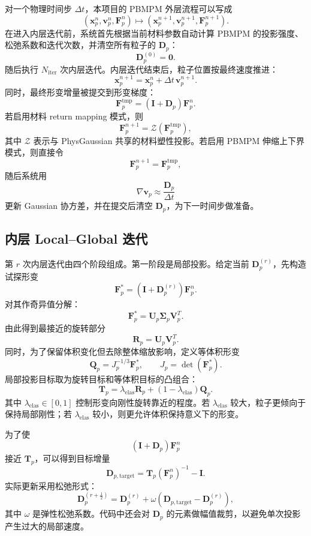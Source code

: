 \documentclass[a4paper]{article}
\begin{document}
对一个物理时间步 $\Delta t$，本项目的 PBMPM 外层流程可以写成
\[
    \left(
        \bm{x}_p^n,
        \bm{v}_p^n,
        \bm{F}_p^n
    \right)
    \longmapsto
    \left(
        \bm{x}_p^{n+1},
        \bm{v}_p^{n+1},
        \bm{F}_p^{n+1}
    \right).
\]
在进入内层迭代前，系统首先根据当前材料参数自动计算 PBMPM 的投影强度、松弛系数和迭代次数，并清空所有粒子的 $\bm{D}_p$：
\[
    \bm{D}_p^{(0)}=\bm{0}.
\]
随后执行 $N_{\mathrm{iter}}$ 次内层迭代。内层迭代结束后，粒子位置按最终速度推进：
\[
    \bm{x}_p^{n+1}
    =
    \bm{x}_p^n
    +
    \Delta t\,\bm{v}_p^{n+1}.
\]
同时，最终形变增量被提交到形变梯度：
\[
    \bm{F}_p^{\mathrm{tmp}}
    =
    \left(
        \bm{I}
        +
        \bm{D}_p
    \right)
    \bm{F}_p^n.
\]
若启用材料 return mapping 模式，则
\[
    \bm{F}_p^{n+1}
    =
    \mathcal{Z}
    \left(
        \bm{F}_p^{\mathrm{tmp}}
    \right),
\]
其中 $\mathcal{Z}$ 表示与 PhysGaussian 共享的材料塑性投影。若启用 PBMPM 伸缩上下界模式，则直接令
\[
    \bm{F}_p^{n+1}
    =
    \bm{F}_p^{\mathrm{tmp}},
\]
随后系统用
\[
    \nabla\bm{v}_p
    \approx
    \frac{\bm{D}_p}{\Delta t}
\]
更新 Gaussian 协方差，并在提交后清空 $\bm{D}_p$，为下一时间步做准备。

\subsection{内层 Local--Global 迭代}

第 $r$ 次内层迭代由四个阶段组成。第一阶段是局部投影。给定当前 $\bm{D}_p^{(r)}$，先构造试探形变
\[
    \bm{F}_p^\ast
    =
    \left(
        \bm{I}
        +
        \bm{D}_p^{(r)}
    \right)
    \bm{F}_p^n.
\]
对其作奇异值分解：
\[
    \bm{F}_p^\ast
    =
    \bm{U}_p
    \bm{\Sigma}_p
    \bm{V}_p^T.
\]
由此得到最接近的旋转部分
\[
    \bm{R}_p
    =
    \bm{U}_p
    \bm{V}_p^T.
\]
同时，为了保留体积变化但去除整体缩放影响，定义等体积形变
\[
    \bm{Q}_p
    =
    J_p^{-1/3}
    \bm{F}_p^\ast,
    \qquad
    J_p
    =
    \det
    \left(
        \bm{F}_p^\ast
    \right).
\]
局部投影目标取为旋转目标和等体积目标的凸组合：
\[
    \bm{T}_p
    =
    \lambda_{\mathrm{elas}}\bm{R}_p
    +
    \left(
        1-\lambda_{\mathrm{elas}}
    \right)
    \bm{Q}_p.
\]
其中 $\lambda_{\mathrm{elas}}\in[0,1]$ 控制形变向刚性旋转靠近的程度。若 $\lambda_{\mathrm{elas}}$ 较大，粒子更倾向于保持局部刚性；若 $\lambda_{\mathrm{elas}}$ 较小，则更允许体积保持意义下的形变。

为了使
\[
    \left(
        \bm{I}
        +
        \bm{D}_p
    \right)
    \bm{F}_p^n
\]
接近 $\bm{T}_p$，可以得到目标增量
\[
    \bm{D}_{p,\mathrm{target}}
    =
    \bm{T}_p
    \left(
        \bm{F}_p^n
    \right)^{-1}
    -
    \bm{I}.
\]
实际更新采用松弛形式：
\[
    \bm{D}_p^{(r+\frac{1}{2})}
    =
    \bm{D}_p^{(r)}
    +
    \omega
    \left(
        \bm{D}_{p,\mathrm{target}}
        -
        \bm{D}_p^{(r)}
    \right),
\]
其中 $\omega$ 是弹性松弛系数。代码中还会对 $\bm{D}_p$ 的元素做幅值裁剪，以避免单次投影产生过大的局部速度。
\end{document}
